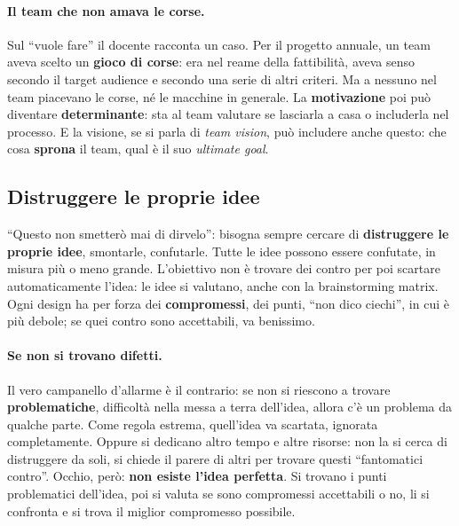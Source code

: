 \paragraph{Il team che non amava le corse.} Sul ``vuole fare'' il docente
racconta un caso. Per il progetto annuale, un team aveva scelto un
\textbf{gioco di corse}: era nel reame della fattibilità, aveva senso secondo
il target audience e secondo una serie di altri criteri. Ma a nessuno nel
team piacevano le corse, né le macchine in generale. La
\textbf{motivazione} poi può diventare \textbf{determinante}: sta al team
valutare se lasciarla a casa o includerla nel processo. E la visione, se si
parla di \emph{team vision}, può includere anche questo: che cosa
\textbf{sprona} il team, qual è il suo \emph{ultimate goal}.

\subsection{Distruggere le proprie idee}

``Questo non smetterò mai di dirvelo'': bisogna sempre cercare di
\textbf{distruggere le proprie idee}, smontarle, confutarle. Tutte le idee
possono essere confutate, in misura più o meno grande. L'obiettivo non è
trovare dei contro per poi scartare automaticamente l'idea: le idee si
valutano, anche con la brainstorming matrix. Ogni design ha per forza dei
\textbf{compromessi}, dei punti, ``non dico ciechi'', in cui è più debole; se
quei contro sono accettabili, va benissimo.

\paragraph{Se non si trovano difetti.} Il vero campanello d'allarme è il
contrario: se non si riescono a trovare \textbf{problematiche}, difficoltà
nella messa a terra dell'idea, allora c'è un problema da qualche parte. Come
regola estrema, quell'idea va scartata, ignorata completamente. Oppure si
dedicano altro tempo e altre risorse: non la si cerca di distruggere da soli,
si chiede il parere di altri per trovare questi ``fantomatici contro''.
Occhio, però: \textbf{non esiste l'idea perfetta}. Si trovano i punti
problematici dell'idea, poi si valuta se sono compromessi accettabili o no,
li si confronta e si trova il miglior compromesso possibile.

